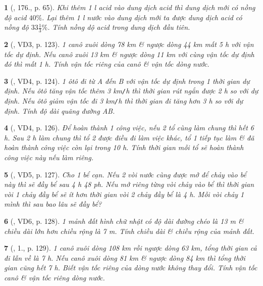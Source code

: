 \documentclass{article}
\newtheorem{baitoan}{}
\begin{document}
\begin{baitoan}[\cite{Tuyen_Toan_9_old}, 176., p. 65]
	Khi thêm {\rm 1 l} acid vào dung dịch acid thì dung dịch mới có nồng độ acid $40\%$. Lại thêm {\rm 1 l} nước vào dung dịch mới ta được dung dịch acid có nồng độ $33\frac{1}{3}\%$. Tính nồng dộ acid trong dung dịch đầu tiên.
\end{baitoan}

\begin{baitoan}[\cite{Kien_dai_so_9}, VD3, p. 123]
	1 canô xuôi dòng {\rm78 km} \& ngược dòng {\rm44 km} mất {\rm5 h} với vận tốc dự định. Nếu canô xuôi {\rm13 km} \& ngược dòng {\rm11 km} với cùng vận tốc dự định đó thì mất {\rm1 h}. Tính vận tốc riêng của canô \& vận tốc dòng nước.
\end{baitoan}

\begin{baitoan}[\cite{Kien_dai_so_9}, VD4, p. 124]
	1 ôtô đi từ A đến B với vận tốc dự định trong 1 thời gian dự định. Nếu ôtô tăng vận tốc thêm {\rm3 km{\tt/}h} thì thời gian rút ngắn được {\rm2 h} so với dự định. Nếu ôtô giảm vận tốc đi {\rm3 km{\tt/}h} thì thời gian đi tăng hơn {\rm3 h} so với dự định. Tính độ dài quãng đường AB.
\end{baitoan}

\begin{baitoan}[\cite{Kien_dai_so_9}, VD4, p. 126]
	Để hoàn thành 1 công việc, nếu 2 tổ cùng làm chung thì hết {\rm6 h}. Sau {\rm2 h} làm chung thì tổ 2 được điều đi làm việc khác, tổ 1 tiếp tục làm \& đã hoàn thành công việc còn lại trong {\rm10 h}. Tính thời gian mỗi tổ sẽ hoàn thành công việc này nếu làm riêng.
\end{baitoan}

\begin{baitoan}[\cite{Kien_dai_so_9}, VD5, p. 127]
	Cho 1 bể cạn. Nếu 2 vòi nước cùng được mở để chảy vào bể này thì sẽ đầy bể sau {\rm4 h 48 ph}. Nếu mở riêng từng vòi chảy vào bể thì thời gian vòi 1 chảy đầy bể sẽ ít hơn thời gian vòi 2 chảy đầy bể là {\rm4 h}. Mỗi vòi chảy 1 mình thì sau bao lâu sẽ đầy bể?
\end{baitoan}

\begin{baitoan}[\cite{Kien_dai_so_9}, VD6, p. 128]
	1 mảnh đất hình chữ nhật có độ dài đường chéo là {\rm13 m} \& chiều dài lớn hơn chiều rộng là {\rm7 m}. Tính chiều dài \& chiều rộng của mảnh đất.
\end{baitoan}

\begin{baitoan}[\cite{Kien_dai_so_9}, 1., p. 129]
	1 canô xuôi dòng {\rm108 km} rồi ngược dòng {\rm63 km}, tổng thời gian cả đi lẫn về là {\rm7 h}. Nếu canô xuôi dòng {\rm81 km} \& ngược dòng {\rm84 km} thì tổng thời gian cũng hết {\rm7 h}. Biết vận tốc riêng của dòng nước không thay đổi. Tính vận tốc canô \& vận tốc riêng dòng nước.
\end{baitoan}
\end{document}
